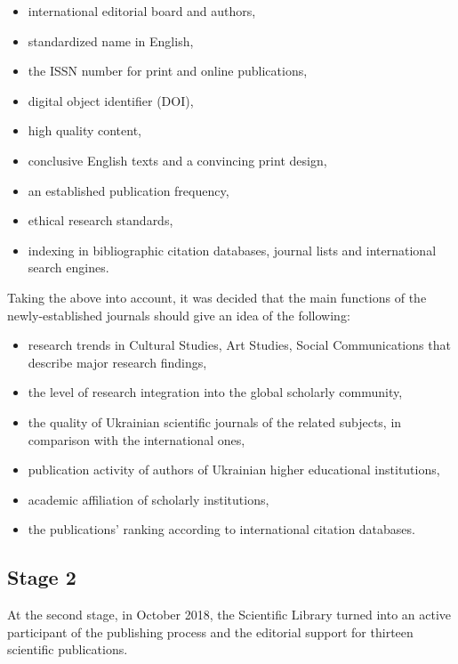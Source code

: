 \documentclass[a4paper,
fontsize=11pt,
oneside,
numbers=noperiodatend,
parskip=half-,
bibliography=totoc,
final
]{scrartcl}
\begin{document}
\begin{itemize}
\item
  international editorial board and authors,
\item
  standardized name in English,
\item
  the ISSN number for print and online publications,
\item
  digital object identifier (DOI),
\item
  high quality content,
\item
  conclusive English texts and a convincing print design,
\item
  an established publication frequency,
\item
  ethical research standards,
\item
  indexing in bibliographic citation databases, journal lists and
  international search engines.
\end{itemize}

Taking the above into account, it was decided that the main functions of
the newly-established journals should give an idea of the following:

\begin{itemize}
\item
  research trends in Cultural Studies, Art Studies, Social
  Communications that describe major research findings,
\item
  the level of research integration into the global scholarly community,
\item
  the quality of Ukrainian scientific journals of the related subjects,
  in comparison with the international ones,
\item
  publication activity of authors of Ukrainian higher educational
  institutions,
\item
  academic affiliation of scholarly institutions,
\item
  the publications' ranking according to international citation
  databases.
\end{itemize}

\hypertarget{stage-2}{%
\subsection{Stage 2}\label{stage-2}}

At the second stage, in October 2018, the Scientific Library turned into
an active participant of the publishing process and the editorial
support for thirteen scientific publications.
\end{document}
